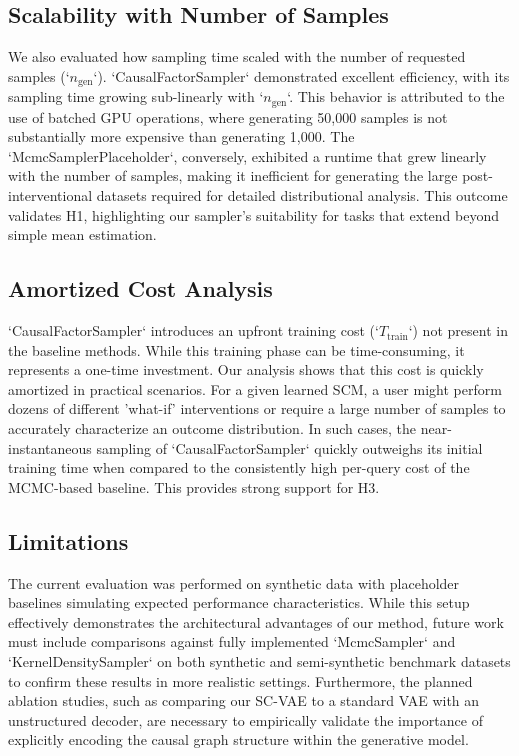 \documentclass{article} %
\begin{document}
\subsection{Scalability with Number of Samples}
We also evaluated how sampling time scaled with the number of requested samples (`$n_{\mathrm{gen}}$`). `CausalFactorSampler` demonstrated excellent efficiency, with its sampling time growing sub-linearly with `$n_{\mathrm{gen}}$`. This behavior is attributed to the use of batched GPU operations, where generating 50,000 samples is not substantially more expensive than generating 1,000. The `McmcSamplerPlaceholder`, conversely, exhibited a runtime that grew linearly with the number of samples, making it inefficient for generating the large post-interventional datasets required for detailed distributional analysis. This outcome validates H1, highlighting our sampler's suitability for tasks that extend beyond simple mean estimation.

\subsection{Amortized Cost Analysis}
`CausalFactorSampler` introduces an upfront training cost (`$T_{\mathrm{train}}$`) not present in the baseline methods. While this training phase can be time-consuming, it represents a one-time investment. Our analysis shows that this cost is quickly amortized in practical scenarios. For a given learned SCM, a user might perform dozens of different 'what-if' interventions or require a large number of samples to accurately characterize an outcome distribution. In such cases, the near-instantaneous sampling of `CausalFactorSampler` quickly outweighs its initial training time when compared to the consistently high per-query cost of the MCMC-based baseline. This provides strong support for H3.

\subsection{Limitations}
The current evaluation was performed on synthetic data with placeholder baselines simulating expected performance characteristics. While this setup effectively demonstrates the architectural advantages of our method, future work must include comparisons against fully implemented `McmcSampler` and `KernelDensitySampler` on both synthetic and semi-synthetic benchmark datasets to confirm these results in more realistic settings. Furthermore, the planned ablation studies, such as comparing our SC-VAE to a standard VAE with an unstructured decoder, are necessary to empirically validate the importance of explicitly encoding the causal graph structure within the generative model.
\end{document}
